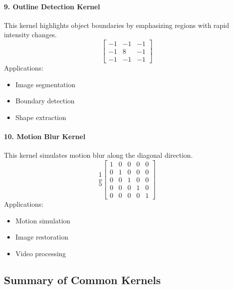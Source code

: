 \documentclass[11pt]{article}
\begin{document}
\vspace{3mm}
\paragraph{9. Outline Detection Kernel}
This kernel highlights object boundaries by emphasizing regions with rapid intensity changes.
\[
\begin{bmatrix} -1 & -1 & -1 \\ -1 & 8 & -1 \\ -1 & -1 & -1 \end{bmatrix}
\]
Applications:
\begin{itemize}
\item Image segmentation
\item Boundary detection
\item Shape extraction
\end{itemize}

\vspace{3mm}
\paragraph{10. Motion Blur Kernel}
This kernel simulates motion blur along the diagonal direction.
\[
\frac{1}{5}
\begin{bmatrix}
1 & 0 & 0 & 0 & 0 \\
0 & 1 & 0 & 0 & 0 \\
0 & 0 & 1 & 0 & 0 \\
0 & 0 & 0 & 1 & 0 \\
0 & 0 & 0 & 0 & 1
\end{bmatrix}
\]
Applications:
\begin{itemize}
\item Motion simulation
\item Image restoration
\item Video processing
\end{itemize}

\vspace{4mm}
\subsection*{Summary of Common Kernels}
\end{document}
